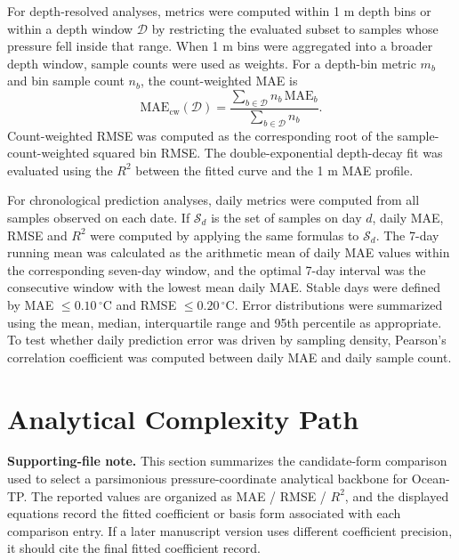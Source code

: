 \documentclass[10pt]{article}
\begin{document}
For depth-resolved analyses, metrics were computed within 1 m depth bins or within a depth window $\mathcal{D}$ by restricting the evaluated subset to samples whose pressure fell inside that range.
When 1 m bins were aggregated into a broader depth window, sample counts were used as weights.
For a depth-bin metric $m_b$ and bin sample count $n_b$, the count-weighted MAE is
\begin{equation}
\mathrm{MAE}_{\mathrm{cw}}(\mathcal{D})=\frac{\sum_{b\in\mathcal{D}}n_b\,\mathrm{MAE}_b}{\sum_{b\in\mathcal{D}}n_b}.
\end{equation}
Count-weighted RMSE was computed as the corresponding root of the sample-count-weighted squared bin RMSE.
The double-exponential depth-decay fit was evaluated using the $R^2$ between the fitted curve and the 1 m MAE profile.

For chronological prediction analyses, daily metrics were computed from all samples observed on each date.
If $\mathcal{S}_d$ is the set of samples on day $d$, daily MAE, RMSE and $R^2$ were computed by applying the same formulas to $\mathcal{S}_d$.
The 7-day running mean was calculated as the arithmetic mean of daily MAE values within the corresponding seven-day window, and the optimal 7-day interval was the consecutive window with the lowest mean daily MAE.
Stable days were defined by MAE $\leq 0.10\,^\circ$C and RMSE $\leq 0.20\,^\circ$C.
Error distributions were summarized using the mean, median, interquartile range and 95th percentile as appropriate.
To test whether daily prediction error was driven by sampling density, Pearson's correlation coefficient was computed between daily MAE and daily sample count.

\vspace{0.8em}

\section{Analytical Complexity Path}
\label{sec:analytical-complexity-path}

\noindent\textcolor{noteRed}{\textbf{Supporting-file note.}}
This section summarizes the candidate-form comparison used to select a parsimonious pressure-coordinate analytical backbone for Ocean-TP.
The reported values are organized as MAE / RMSE / $R^2$, and the displayed equations record the fitted coefficient or basis form associated with each comparison entry.
If a later manuscript version uses different coefficient precision, it should cite the final fitted coefficient record.
\end{document}
